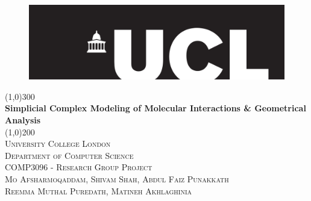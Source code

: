 \documentclass[9pt]{article}
\begin{document}
\begin{titlepage}
\begin{center}
\begin{figure}[t]
\hspace*{0.35cm}\includegraphics[width=1.0\textwidth]{uclLogo}\\
\end{figure}
\line(1,0){300}\\
[0.25in]
\huge{\bfseries Simplicial Complex Modeling of Molecular Interactions \& Geometrical Analysis}\\
[2mm]
\line(1,0){200}\\
[1.5cm]
\textsc{\LARGE University College London}\\
\textsc{\normalsize Department of Computer Science}\\
\textsc{\normalsize COMP3096 - Research Group Project}\\
\textsc{\normalsize Mo Afsharmoqaddam, Shivam Shah, Abdul Faiz Punakkath}\\
\textsc{\normalsize Reemma Muthal Puredath, Matineh Akhlaghinia}\\

\end{center}

\end{titlepage}

\newpage
\end{document}
